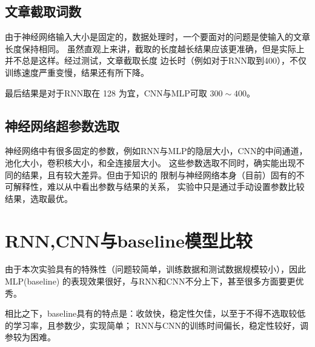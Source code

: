 \documentclass[a4paper]{article}
\begin{document}



    \subsection{文章截取词数}

    由于神经网络输入大小是固定的，数据处理时，一个要面对的问题是使输入的文章长度保持相同。
    虽然直观上来讲，截取的长度越长结果应该更准确，但是实际上并不总是这样。经过测试，文章截取长度
    边长时（例如对于RNN取到400），不仅训练速度严重变慢，结果还有所下降。
    
    最后结果是对于RNN取在 128 为宜，CNN与MLP可取 $300\sim400$。

    \subsection{神经网络超参数选取}

    神经网络中有很多固定的参数，例如RNN与MLP的隐层大小，CNN的中间通道，池化大小，卷积核大小，和全连接层大小。
    这些参数选取不同时，确实能出现不同的结果，且有较大差异。但由于知识的
    限制与神经网络本身（目前）固有的不可解释性，难以从中看出参数与结果的关系，
    实验中只是通过手动设置参数比较结果，选取最优。

    \section{RNN,CNN与baseline模型比较}
    由于本次实验具有的特殊性（问题较简单，训练数据和测试数据规模较小），因此
    MLP(baseline) 的表现效果很好，与RNN和CNN不分上下，甚至很多方面要更优秀。

    相比之下，baseline具有的特点是：收敛快，稳定性欠佳，以至于不得不选取较低的学习率，且参数少，实现简单；
    RNN与CNN的训练时间偏长，稳定性较好，调参较为困难。
\end{document}
